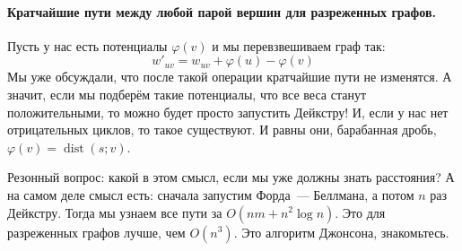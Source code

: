 \documentclass{article}
\begin{document}
    \paragraph{Кратчайшие пути между любой парой вершин для разреженных графов.}
    Пусть у нас есть потенциалы $\varphi(v)$ и мы перевзвешиваем граф так:
    $$w'_{uv}=w_{uv}+\varphi(u)-\varphi(v)$$
    Мы уже обсуждали, что после такой операции кратчайшие пути не изменятся. А значит, если мы подберём такие потенциалы, что все веса станут положительными, то можно будет просто запустить Дейкстру! И, если у нас нет отрицательных циклов, то такое существуют. И равны они, барабанная дробь, $\varphi(v)=\operatorname{dist}(s;v)$.
    \begin{figure}[H]
        \qquad\qquad
    \end{figure}\noindent
    Резонный вопрос: какой в этом смысл, если мы уже должны знать расстояния? А на самом деле смысл есть: сначала запустим Форда~--- Беллмана, а потом $n$ раз Дейкстру. Тогда мы узнаем все пути за $O(nm+n^2\log n)$. Это для разреженных графов лучше, чем $O(n^3)$. Это алгоритм Джонсона, знакомьтесь.
\end{document}
